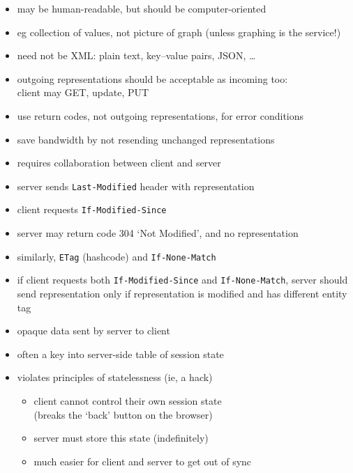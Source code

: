 \documentclass{sepslide-soa-faked} %
\begin{document}
\begin{slide}
\begin{itemize}
\item may be human-readable, but should be computer-oriented
\item eg collection of values, not picture of graph
  (unless graphing is the service!)
\item need not be XML: plain text, key--value pairs, JSON, \ldots
\item outgoing representations should be acceptable as incoming too: \\
  client may GET, update, PUT
\item use return codes, not outgoing representations, for error conditions
\end{itemize}
\end{slide}

\begin{slide}
\begin{itemize}
\item save bandwidth by not resending unchanged representations
\item requires collaboration between client and server
\item server sends \verb"Last-Modified" header with representation
\item client requests \verb"If-Modified-Since" 
\item server may return code 304 `Not Modified', and no representation
\item similarly, \verb"ETag" (hashcode) and \verb"If-None-Match"
\item if client requests both \verb"If-Modified-Since" and \verb"If-None-Match", server should send representation only if representation is modified and has different entity tag
\end{itemize}
\end{slide}

\begin{slide}
\begin{itemize}
\item opaque data sent by server to client
\item often a key into server-side table of session state
\item violates principles of statelessness (ie, a hack)
  \begin{itemize}
  \item client cannot control their own session state \\
    (breaks the `back' button on the browser)
  \item server must store this state (indefinitely)
  \item much easier for client and server to get out of sync
  \end{itemize}
\end{itemize}
\end{slide}
\end{document}
